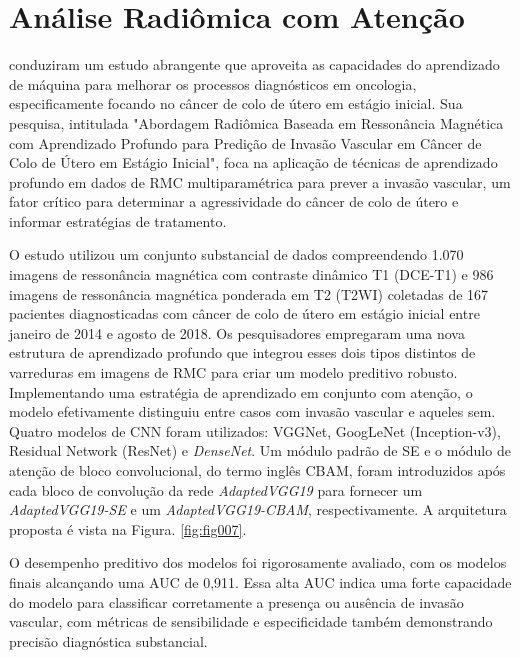 \section{Análise Radiômica com Atenção}
\label{sec:analise_radiomica}

 conduziram um estudo abrangente que aproveita as capacidades do aprendizado de máquina para melhorar os processos diagnósticos em oncologia, especificamente focando no câncer de colo de útero em estágio inicial. Sua pesquisa, intitulada "Abordagem Radiômica Baseada em Ressonância Magnética com Aprendizado Profundo para Predição de Invasão Vascular em Câncer de Colo de Útero em Estágio Inicial", foca na aplicação de técnicas de aprendizado profundo em dados de \gls{RMC} multiparamétrica para prever a invasão vascular, um fator crítico para determinar a agressividade do câncer de colo de útero e informar estratégias de tratamento.

O estudo utilizou um conjunto substancial de dados compreendendo 1.070 imagens de ressonância magnética com contraste dinâmico T1 (DCE-T1) e 986 imagens de ressonância magnética ponderada em T2 (T2WI) coletadas de 167 pacientes diagnosticadas com câncer de colo de útero em estágio inicial entre janeiro de 2014 e agosto de 2018. Os pesquisadores empregaram uma nova estrutura de aprendizado profundo que integrou esses dois tipos distintos de varreduras em imagens de \gls{RMC} para criar um modelo preditivo robusto. Implementando uma estratégia de aprendizado em conjunto com atenção, o modelo efetivamente distinguiu entre casos com invasão vascular e aqueles sem. Quatro modelos de CNN foram utilizados: VGGNet, GoogLeNet (Inception-v3), Residual Network (ResNet) e \textit{DenseNet}. Um módulo padrão de \gls{SE}  e o módulo de atenção de bloco convolucional, do termo inglês \gls{CBAM},  foram introduzidos após cada bloco de convolução da rede \textit{AdaptedVGG19} para fornecer um \textit{AdaptedVGG19-SE} e um \textit{AdaptedVGG19-CBAM}, respectivamente. A arquitetura proposta é vista na Figura. \ref{fig:fig007}.

O desempenho preditivo dos modelos foi rigorosamente avaliado, com os modelos finais alcançando uma \gls{AUC} de 0,911. Essa alta \gls{AUC} indica uma forte capacidade do modelo para classificar corretamente a presença ou ausência de invasão vascular, com métricas de sensibilidade e especificidade também demonstrando precisão diagnóstica substancial.

